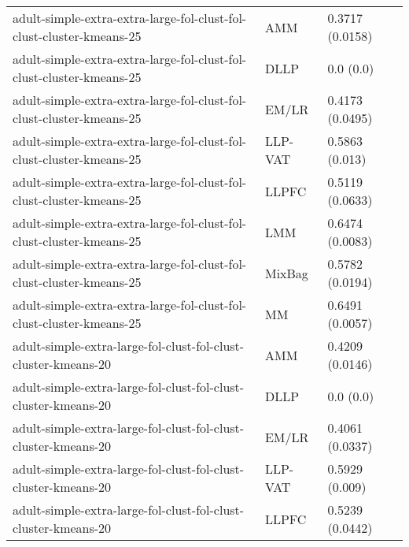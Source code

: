 \begin{longtable}{lll}
                                         adult-simple-extra-extra-large-fol-clust-fol-clust-cluster-kmeans-25 &       AMM &                       0.3717 (0.0158) \\
                                         adult-simple-extra-extra-large-fol-clust-fol-clust-cluster-kmeans-25 &      DLLP &                             0.0 (0.0) \\
                                         adult-simple-extra-extra-large-fol-clust-fol-clust-cluster-kmeans-25 &     EM/LR &                       0.4173 (0.0495) \\
                                         adult-simple-extra-extra-large-fol-clust-fol-clust-cluster-kmeans-25 &   LLP-VAT &                        0.5863 (0.013) \\
                                         adult-simple-extra-extra-large-fol-clust-fol-clust-cluster-kmeans-25 &     LLPFC &                       0.5119 (0.0633) \\
                                         adult-simple-extra-extra-large-fol-clust-fol-clust-cluster-kmeans-25 &       LMM &                       0.6474 (0.0083) \\
                                         adult-simple-extra-extra-large-fol-clust-fol-clust-cluster-kmeans-25 &    MixBag &                       0.5782 (0.0194) \\
                                         adult-simple-extra-extra-large-fol-clust-fol-clust-cluster-kmeans-25 &        MM &                       0.6491 (0.0057) \\
                                               adult-simple-extra-large-fol-clust-fol-clust-cluster-kmeans-20 &       AMM &                       0.4209 (0.0146) \\
                                               adult-simple-extra-large-fol-clust-fol-clust-cluster-kmeans-20 &      DLLP &                             0.0 (0.0) \\
                                               adult-simple-extra-large-fol-clust-fol-clust-cluster-kmeans-20 &     EM/LR &                       0.4061 (0.0337) \\
                                               adult-simple-extra-large-fol-clust-fol-clust-cluster-kmeans-20 &   LLP-VAT &                        0.5929 (0.009) \\
                                               adult-simple-extra-large-fol-clust-fol-clust-cluster-kmeans-20 &     LLPFC &                       0.5239 (0.0442) \\

\end{longtable}
